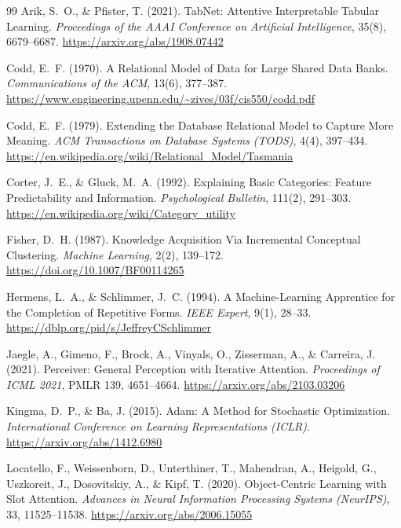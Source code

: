 \documentclass[10pt,a4paper]{article}
\begin{document}
\begin{thebibliography}{99}
\small
{}
Arik, S.~O., \& Pfister, T. (2021). TabNet: Attentive Interpretable Tabular Learning. \textit{Proceedings of the AAAI Conference on Artificial Intelligence}, 35(8), 6679--6687. \url{https://arxiv.org/abs/1908.07442}

Codd, E.~F. (1970). A Relational Model of Data for Large Shared Data Banks. \textit{Communications of the ACM}, 13(6), 377--387. \url{https://www.engineering.upenn.edu/~zives/03f/cis550/codd.pdf}

Codd, E.~F. (1979). Extending the Database Relational Model to Capture More Meaning. \textit{ACM Transactions on Database Systems (TODS)}, 4(4), 397--434. \url{https://en.wikipedia.org/wiki/Relational_Model/Tasmania}

Corter, J.~E., \& Gluck, M.~A. (1992). Explaining Basic Categories: Feature Predictability and Information. \textit{Psychological Bulletin}, 111(2), 291--303. \url{https://en.wikipedia.org/wiki/Category_utility}

Fisher, D.~H. (1987). Knowledge Acquisition Via Incremental Conceptual Clustering. \textit{Machine Learning}, 2(2), 139--172. \url{https://doi.org/10.1007/BF00114265}

Hermens, L.~A., \& Schlimmer, J.~C. (1994). A Machine-Learning Apprentice for the Completion of Repetitive Forms. \textit{IEEE Expert}, 9(1), 28--33. \url{https://dblp.org/pid/s/JeffreyCSchlimmer}

Jaegle, A., Gimeno, F., Brock, A., Vinyals, O., Zisserman, A., \& Carreira, J. (2021). Perceiver: General Perception with Iterative Attention. \textit{Proceedings of ICML 2021}, PMLR 139, 4651--4664. \url{https://arxiv.org/abs/2103.03206}

Kingma, D.~P., \& Ba, J. (2015). Adam: A Method for Stochastic Optimization. \textit{International Conference on Learning Representations (ICLR)}. \url{https://arxiv.org/abs/1412.6980}

Locatello, F., Weissenborn, D., Unterthiner, T., Mahendran, A., Heigold, G., Uszkoreit, J., Dosovitskiy, A., \& Kipf, T. (2020). Object-Centric Learning with Slot Attention. \textit{Advances in Neural Information Processing Systems (NeurIPS)}, 33, 11525--11538. \url{https://arxiv.org/abs/2006.15055}


\end{thebibliography}
\end{document}
